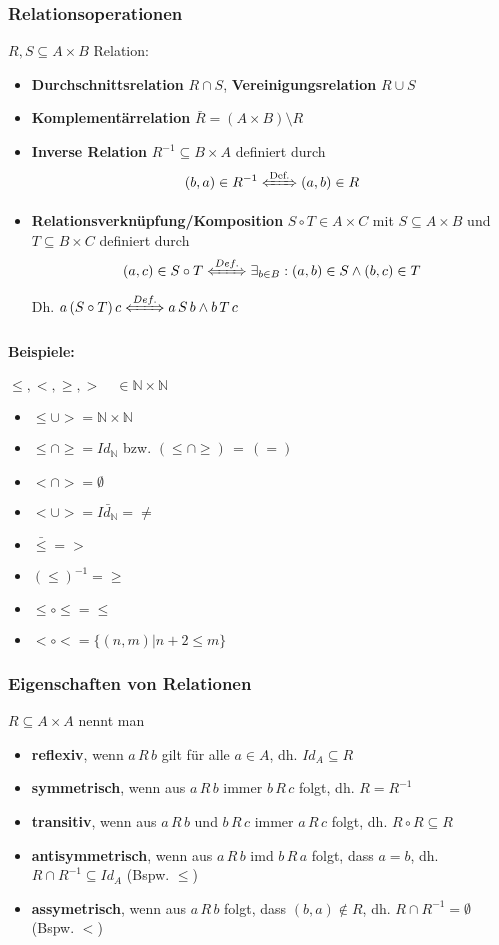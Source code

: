 \subsubsection{Relationsoperationen}
$R,S\subseteq A\times B$ Relation:
\begin{itemize}
\item \textbf{Durchschnittsrelation} $R\cap S$, \textbf{Vereinigungsrelation} $R\cup S$
\item \textbf{Komplementärrelation} $\bar{R}=(A\times B)\setminus R$
\item \textbf{Inverse Relation} $R^{-1}\subseteq B\times A$ definiert durch
\[
(b,a)\in R^{-1} \xLeftrightarrow{\text{Def.}} (a,b)\in R
\]
\item \textbf{Relationsverknüpfung/Komposition} $S\circ T\in A\times C$ mit $S\subseteq A\times B$ und $T\subseteq B\times C$ definiert durch
\[
(a,c)\in S\circ T \xLeftrightarrow{Def.}\exists_{b\in B}: (a,b)\in S \land (b,c)\in T
\]
Dh. $a\, (S\circ T)\, c \xLeftrightarrow{Def.} a\,S\,b \land b\,T\,c$
\end{itemize}

\paragraph{Beispiele:} $\leq,<,\geq,>\quad\in \mathbb{N}\times\mathbb{N}$
\begin{itemize}
\item $\leq\cup > = \mathbb{N}\times\mathbb{N}$
\item $\leq\cap\geq= Id_\mathbb{N}$ bzw. \glqq $(\leq \cap \geq) \,=\, (=)$\grqq 
\item $<\cap > = \emptyset$
\item $<\cup > = \bar{Id_\mathbb{N}} = \neq$
\item $\bar{\leq} = >$
\item $(\leq)^{-1} = \geq $
\item $\leq\circ\leq = \leq$
\item $< \circ < = \{(n,m) | n+2\leq m\}$
\end{itemize}

\subsubsection{Eigenschaften von Relationen}
$R\subseteq A\times A$ nennt man
\begin{itemize}
\item \textbf{reflexiv}, wenn $a\,R\,b$ gilt für alle $a\in A$, dh. $Id_A \subseteq R$
\item \textbf{symmetrisch}, wenn aus $a\,R\,b$ immer $b\,R\,c$ folgt, dh. $R=R^{-1}$
\item \textbf{transitiv}, wenn aus $a\,R\,b$ und $b\,R\,c$ immer $a\,R\,c$ folgt, dh. $R\circ R\subseteq R$
\item \textbf{antisymmetrisch}, wenn aus $a\,R\,b$ imd $b\,R\,a$ folgt, dass $a=b$, dh. $R\cap R^{-1}\subseteq Id_A$ (Bspw. $\leq$)
\item \textbf{assymetrisch}, wenn aus $a\,R\,b$ folgt, dass $(b,a)\notin R$, dh. $R\cap R^{-1}=\emptyset$ (Bspw. $<$)
\end{itemize}

